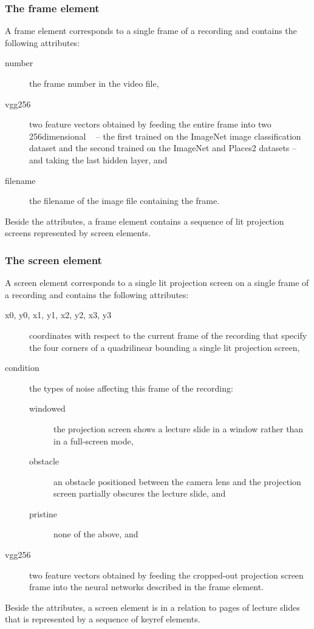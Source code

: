 \subsubsection*{The frame element}
A frame element corresponds to a single frame of a recording and contains the
following attributes:
\begin{description}
  \item[number] the frame number in the video file,
  \item[vgg256] two feature vectors obtained by feeding the entire
    frame into two 256dimensional ~\cite{simonyan2014very} -- the first trained on the ImageNet%
     image
    classification dataset and the second trained on the ImageNet and
    Places2
    datasets -- and taking the last hidden layer, and
  \item[filename] the filename of the image file containing the frame.
\end{description}
Beside the attributes, a frame element contains a sequence of lit projection
screens represented by screen elements.

\subsubsection*{The screen element}
A screen element corresponds to a single lit projection screen on a single
frame of a recording and contains the following attributes:
\begin{description}
  \item[x0\textmd, y0\textmd, x1\textmd, y1\textmd, x2\textmd, y2\textmd,
        x3\textmd, y3] coordinates with respect to the current frame
    of the recording that specify the four corners of a quadrilinear
    bounding a single lit projection screen,
  \item[condition] the types of noise affecting this frame of the recording:
    \begin{description}
      \item[windowed] the projection screen shows a lecture slide in a window
        rather than in a full-screen mode,
      \item[obstacle] an obstacle positioned between the camera lens and the
        projection screen partially obscures the lecture slide, and
      \item[pristine] none of the above, and
    \end{description}
  \item[vgg256] two feature vectors obtained by feeding the cropped-out
    projection screen frame into the neural networks described in the frame
    element.
\end{description}
Beside the attributes, a screen element is in a relation to pages of lecture
slides that is represented by a sequence of keyref elements.

